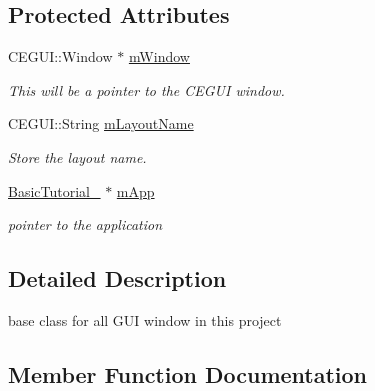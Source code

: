 \subsection*{Protected Attributes}
\begin{DoxyCompactItemize}
\item 
C\+E\+G\+U\+I\+::\+Window $\ast$ \hyperlink{class_n_c_t_u_1_1_g_u_i_window_a163e8089c4b71d29851ccc155bb81c14}{m\+Window}\hypertarget{class_n_c_t_u_1_1_g_u_i_window_a163e8089c4b71d29851ccc155bb81c14}{}\label{class_n_c_t_u_1_1_g_u_i_window_a163e8089c4b71d29851ccc155bb81c14}

\begin{DoxyCompactList}\small\item\em This will be a pointer to the C\+E\+G\+UI window. \end{DoxyCompactList}\item 
C\+E\+G\+U\+I\+::\+String \hyperlink{class_n_c_t_u_1_1_g_u_i_window_a3335697525abec4a6867f5a2d0b4cb60}{m\+Layout\+Name}\hypertarget{class_n_c_t_u_1_1_g_u_i_window_a3335697525abec4a6867f5a2d0b4cb60}{}\label{class_n_c_t_u_1_1_g_u_i_window_a3335697525abec4a6867f5a2d0b4cb60}

\begin{DoxyCompactList}\small\item\em Store the layout name. \end{DoxyCompactList}\item 
\hyperlink{class_basic_tutorial__00}{Basic\+Tutorial\+\_} $\ast$ \hyperlink{class_n_c_t_u_1_1_g_u_i_window_a81091ea09d7efcc472878fcb6c774e7a}{m\+App}\hypertarget{class_n_c_t_u_1_1_g_u_i_window_a81091ea09d7efcc472878fcb6c774e7a}{}\label{class_n_c_t_u_1_1_g_u_i_window_a81091ea09d7efcc472878fcb6c774e7a}

\begin{DoxyCompactList}\small\item\em pointer to the application \end{DoxyCompactList}\end{DoxyCompactItemize}


\subsection{Detailed Description}
base class for all G\+UI window in this project 

\subsection{Member Function Documentation}
